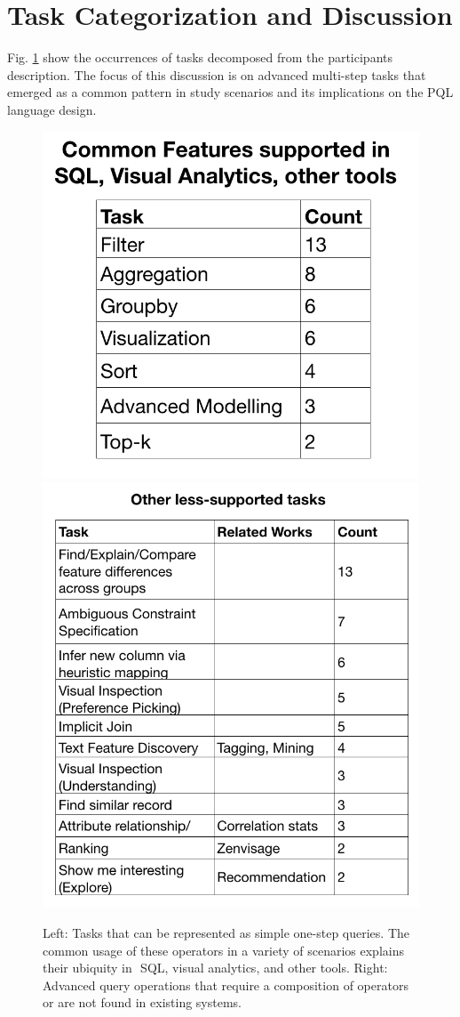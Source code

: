 \documentclass{sig-alternate-05-2015}
\begin{document}
\section{Task Categorization and Discussion}
Fig. \ref{tasks} show the occurrences of tasks decomposed from the participants description. The focus of this discussion is on advanced multi-step tasks that emerged as a common pattern in study scenarios and its implications on the PQL language design.
\begin{figure}[ht!]\label{tasks}
\includegraphics[width=0.5\linewidth]{figures/supported_tasks.png}
\includegraphics[width=0.5\linewidth]{figures/advanced_tasks.png}
\caption{Left: Tasks that can be represented as simple one-step queries. The common usage of these operators in a variety of scenarios explains their ubiquity in  SQL, visual analytics, and other tools. Right: Advanced query operations that require a composition of operators or are not found in existing systems.}
\end{figure}
\end{document}
